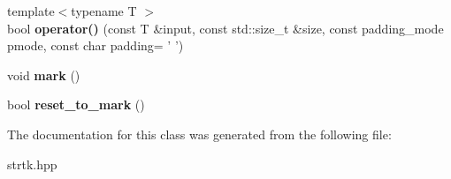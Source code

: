 \begin{DoxyCompactItemize}
\item 
\hypertarget{classstrtk_1_1binary_1_1writer_a3ac538292d496519733107a436cf43f6}{{\footnotesize template$<$typename T $>$ }\\bool {\bfseries operator()} (const T \&input, const std\-::size\-\_\-t \&size, const padding\-\_\-mode pmode, const char padding= ' ')}\label{classstrtk_1_1binary_1_1writer_a3ac538292d496519733107a436cf43f6}

\item 
\hypertarget{classstrtk_1_1binary_1_1writer_ac0fb8f4e4fb6f7858ca6c39e2bb5fce0}{void {\bfseries mark} ()}\label{classstrtk_1_1binary_1_1writer_ac0fb8f4e4fb6f7858ca6c39e2bb5fce0}

\item 
\hypertarget{classstrtk_1_1binary_1_1writer_a833d765385ec0f1575a78fb3d85c95bf}{bool {\bfseries reset\-\_\-to\-\_\-mark} ()}\label{classstrtk_1_1binary_1_1writer_a833d765385ec0f1575a78fb3d85c95bf}

\end{DoxyCompactItemize}


The documentation for this class was generated from the following file\-:\begin{DoxyCompactItemize}
\item 
strtk.\-hpp\end{DoxyCompactItemize}
